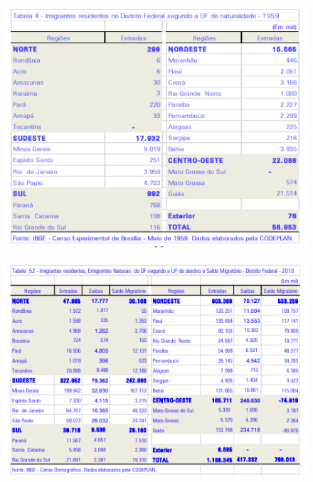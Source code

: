 \lipsum[1-30]

\begin{figure}[h]
    \centering
    \includegraphics[width=0.7\linewidth]{fig/imigrantes-1959}
    \caption{}
\end{figure}

\begin{figure}[h]
    \centering
    \includegraphics[width=0.7\linewidth]{fig/imigrantes-2010}
    \caption{}
    \label{fig:imigrantes-2010}
\end{figure}

